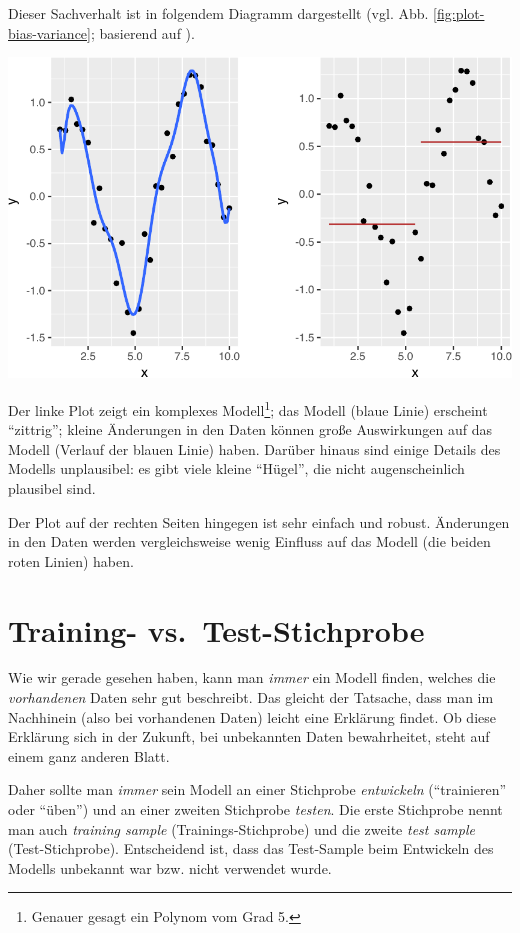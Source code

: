\documentclass[12pt,ngerman,]{book}
\let\rmarkdownfootnote\footnote%
\def\footnote{\protect\rmarkdownfootnote}
\begin{document}
Dieser Sachverhalt ist in folgendem Diagramm dargestellt (vgl. Abb.
\ref{fig:plot-bias-variance}; basierend auf \citep{kuhn2013applied}).

\begin{center}\includegraphics[width=0.7\linewidth]{060_Modellieren_files/figure-latex/plot-bias-variance-1} \end{center}

Der linke Plot zeigt ein komplexes Modell\footnote{Genauer gesagt ein
  Polynom vom Grad 5.}; das Modell (blaue Linie) erscheint ``zittrig'';
kleine Änderungen in den Daten können große Auswirkungen auf das Modell
(Verlauf der blauen Linie) haben. Darüber hinaus sind einige Details des
Modells unplausibel: es gibt viele kleine ``Hügel'', die nicht
augenscheinlich plausibel sind.

Der Plot auf der rechten Seiten hingegen ist sehr einfach und robust.
Änderungen in den Daten werden vergleichsweise wenig Einfluss auf das
Modell (die beiden roten Linien) haben.

\section{Training-
vs.~Test-Stichprobe}\label{training--vs.test-stichprobe}

Wie wir gerade gesehen haben, kann man \emph{immer} ein Modell finden,
welches die \emph{vorhandenen} Daten sehr gut beschreibt. Das gleicht
der Tatsache, dass man im Nachhinein (also bei vorhandenen Daten) leicht
eine Erklärung findet. Ob diese Erklärung sich in der Zukunft, bei
unbekannten Daten bewahrheitet, steht auf einem ganz anderen Blatt.

Daher sollte man \emph{immer} sein Modell an einer Stichprobe
\emph{entwickeln} (``trainieren'' oder ``üben'') und an einer zweiten
Stichprobe \emph{testen}. Die erste Stichprobe nennt man auch
\emph{training sample} (Trainings-Stichprobe) und die zweite \emph{test
sample} (Test-Stichprobe). Entscheidend ist, dass das Test-Sample beim
Entwickeln des Modells unbekannt war bzw. nicht verwendet wurde.
\end{document}
